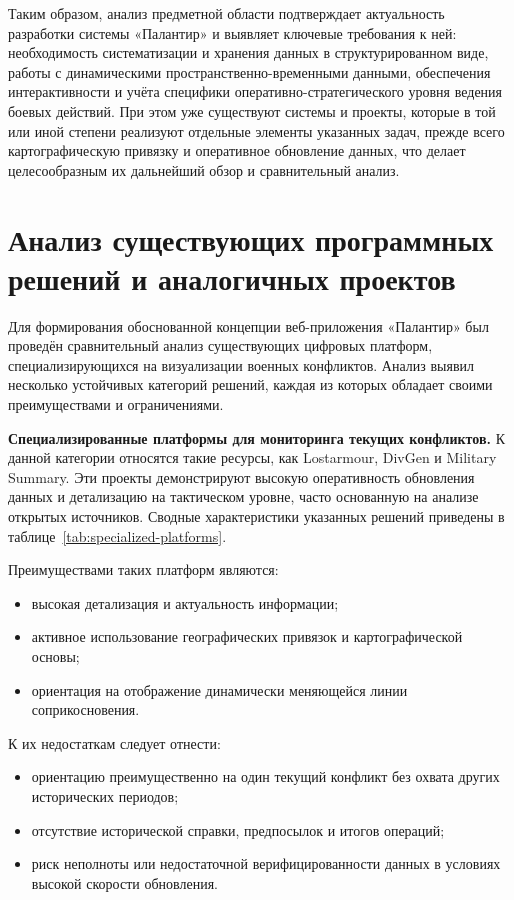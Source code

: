 Таким образом, анализ предметной области подтверждает актуальность разработки системы «Палантир» и выявляет ключевые требования к ней: необходимость систематизации и хранения данных в структурированном виде, работы с динамическими пространственно-временными данными, обеспечения интерактивности и учёта специфики оперативно-стратегического уровня ведения боевых действий. При этом уже существуют системы и проекты, которые в той или иной степени реализуют отдельные элементы указанных задач, прежде всего картографическую привязку и оперативное обновление данных, что делает целесообразным их дальнейший обзор и сравнительный анализ.

\section{Анализ существующих программных решений и аналогичных проектов}

Для формирования обоснованной концепции веб-приложения «Палантир» был проведён сравнительный анализ существующих цифровых платформ, специализирующихся на визуализации военных конфликтов. Анализ выявил несколько устойчивых категорий решений, каждая из которых обладает своими преимуществами и ограничениями.

\textbf{Специализированные платформы для мониторинга текущих конфликтов.} К данной категории относятся такие ресурсы, как Lostarmour, DivGen и Military Summary. Эти проекты демонстрируют высокую оперативность обновления данных и детализацию на тактическом уровне, часто основанную на анализе открытых источников. Сводные характеристики указанных решений приведены в таблице~\ref{tab:specialized-platforms}.

Преимуществами таких платформ являются:
\begin{itemize}
\item высокая детализация и актуальность информации;
\item активное использование географических привязок и картографической основы;
\item ориентация на отображение динамически меняющейся линии соприкосновения.
\end{itemize}

К их недостаткам следует отнести:
\begin{itemize}
\item ориентацию преимущественно на один текущий конфликт без охвата других исторических периодов;
\item отсутствие исторической справки, предпосылок и итогов операций;
\item риск неполноты или недостаточной верифицированности данных в условиях высокой скорости обновления.
\end{itemize}

